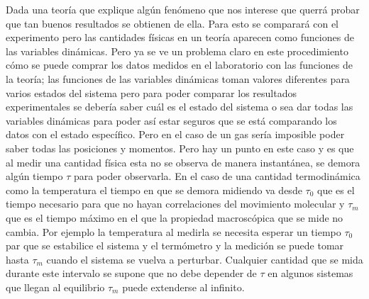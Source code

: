 Dada una teoría que explique algún fenómeno que nos interese que querrá probar que tan buenos resultados se obtienen de ella. Para esto se comparará con el experimento pero las cantidades físicas en un teoría aparecen como funciones de las variables dinámicas. Pero ya se ve un problema claro en este procedimiento cómo se puede comprar los datos medidos en el laboratorio con las funciones de la teoría; las funciones de las variables dinámicas toman valores diferentes para varios estados del sistema pero para poder comparar los resultados experimentales se debería saber cuál es el estado del sistema o sea dar todas las variables dinámicas para poder así estar seguros que se está comparando los datos con el estado específico. Pero en el caso de un gas sería imposible poder saber todas las posiciones y momentos. Pero hay un punto en este caso y es que al medir una cantidad física esta no se observa de manera instantánea, se demora algún tiempo $\tau$ para poder observarla. En el caso de una cantidad termodinámica como la temperatura el tiempo en que se demora midiendo va desde $\tau_{0}$ que es el tiempo necesario para que no hayan correlaciones del movimiento molecular y  $\tau_{m}$ que es el tiempo máximo en el que la propiedad macroscópica que se mide no cambia. Por ejemplo la temperatura al medirla se necesita esperar un tiempo $\tau_{0}$ par que se estabilice el sistema y el termómetro y la medición se puede tomar hasta $\tau_{m}$ cuando el sistema se vuelva a perturbar. Cualquier cantidad que se mida durante este intervalo se supone que no debe depender de $\tau$ en algunos sistemas que llegan al equilibrio $\tau_{m}$ puede extenderse al infinito.






